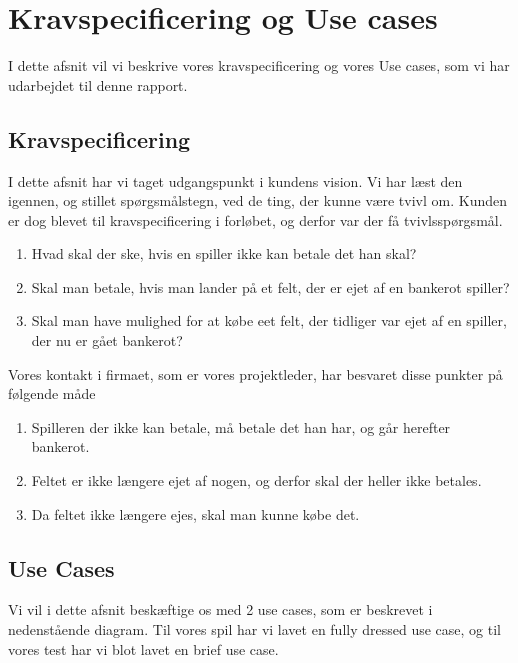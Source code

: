 \section{Kravspecificering og Use cases}
I dette afsnit vil vi beskrive vores kravspecificering og vores Use cases, som vi har udarbejdet til denne rapport.
\subsection{Kravspecificering}
I dette afsnit har vi taget udgangspunkt i kundens vision. Vi har læst den igennen, og stillet spørgsmålstegn, ved de ting, der kunne være tvivl om. Kunden er dog blevet til kravspecificering i forløbet, og derfor var der få tvivlsspørgsmål.
\begin{enumerate}
\item Hvad skal der ske, hvis en spiller ikke kan betale det han skal?
\item Skal man betale, hvis man lander på et felt, der er ejet af en bankerot spiller?
\item Skal man have mulighed for at købe eet felt, der tidliger var ejet af en spiller, der nu er gået bankerot?
\end{enumerate}
Vores kontakt i firmaet, som er vores projektleder, har besvaret disse punkter på følgende måde
\begin{enumerate}
\item Spilleren der ikke kan betale, må betale det han har, og går herefter bankerot.
\item Feltet er ikke længere ejet af nogen, og derfor skal der heller ikke betales.
\item Da feltet ikke længere ejes, skal man kunne købe det.
\end{enumerate}
\subsection{Use Cases}
Vi vil i dette afsnit beskæftige os med 2 use cases, som er beskrevet i nedenstående diagram. Til vores spil har vi lavet en fully dressed use case, og til vores test har vi blot lavet en brief use case.
